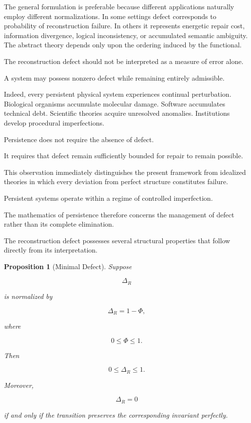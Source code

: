 \documentclass[11pt]{book}
\numberwithin{equation}{chapter}
\theoremstyle{definition}
\theoremstyle{plain}
\newtheorem{proposition}[definition]{Proposition}
\begin{document}
The general formulation is preferable because different applications naturally employ different normalizations. In some settings defect corresponds to probability of reconstruction failure. In others it represents energetic repair cost, information divergence, logical inconsistency, or accumulated semantic ambiguity. The abstract theory depends only upon the ordering induced by the functional.

The reconstruction defect should not be interpreted as a measure of error alone.

A system may possess nonzero defect while remaining entirely admissible.

Indeed, every persistent physical system experiences continual perturbation. Biological organisms accumulate molecular damage. Software accumulates technical debt. Scientific theories acquire unresolved anomalies. Institutions develop procedural imperfections.

Persistence does not require the absence of defect.

It requires that defect remain sufficiently bounded for repair to remain possible.

This observation immediately distinguishes the present framework from idealized theories in which every deviation from perfect structure constitutes failure.

Persistent systems operate within a regime of controlled imperfection.

The mathematics of persistence therefore concerns the management of defect rather than its complete elimination.

The reconstruction defect possesses several structural properties that follow directly from its interpretation.

\begin{proposition}[Minimal Defect]

Suppose

\[
\Delta_R
\]

is normalized by

\[
\Delta_R=1-\Phi,
\]

where

\[
0\le\Phi\le1.
\]

Then

\[
0\le\Delta_R\le1.
\]

Moreover,

\[
\Delta_R=0
\]

if and only if the transition preserves the corresponding invariant perfectly.

\end{proposition}
\end{document}
